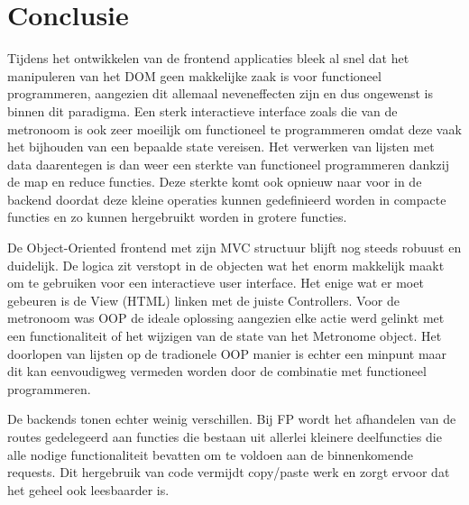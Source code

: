 
\chapter{Conclusie}
\label{ch:conclusie}

Tijdens het ontwikkelen van de frontend applicaties bleek al snel dat het manipuleren van het DOM geen makkelijke zaak is voor functioneel programmeren, aangezien dit allemaal neveneffecten zijn en dus ongewenst is binnen dit paradigma. Een sterk interactieve interface zoals die van de metronoom is ook zeer moeilijk om functioneel te programmeren omdat deze vaak het bijhouden van een bepaalde state vereisen. Het verwerken van lijsten met data daarentegen is dan weer een sterkte van functioneel programmeren dankzij de map en reduce functies. Deze sterkte komt ook opnieuw naar voor in de backend doordat deze kleine operaties kunnen gedefinieerd worden in compacte functies en zo kunnen hergebruikt worden in grotere functies. 

De Object-Oriented frontend met zijn MVC structuur blijft nog steeds robuust en duidelijk. De logica zit verstopt in de objecten wat het enorm makkelijk maakt om te gebruiken voor een interactieve user interface. Het enige wat er moet gebeuren is de View (HTML) linken met de juiste Controllers. Voor de metronoom was OOP de ideale oplossing aangezien elke actie werd gelinkt met een functionaliteit of het wijzigen van de state van het Metronome object. Het doorlopen van lijsten op de tradionele OOP manier is echter een minpunt maar dit kan eenvoudigweg vermeden worden door de combinatie met functioneel programmeren.

De backends tonen echter weinig verschillen. Bij FP wordt het afhandelen van de routes gedelegeerd aan functies die bestaan uit allerlei kleinere deelfuncties die alle nodige functionaliteit bevatten om te voldoen aan de binnenkomende requests. Dit hergebruik van code vermijdt copy/paste werk en zorgt ervoor dat het geheel ook leesbaarder is.

